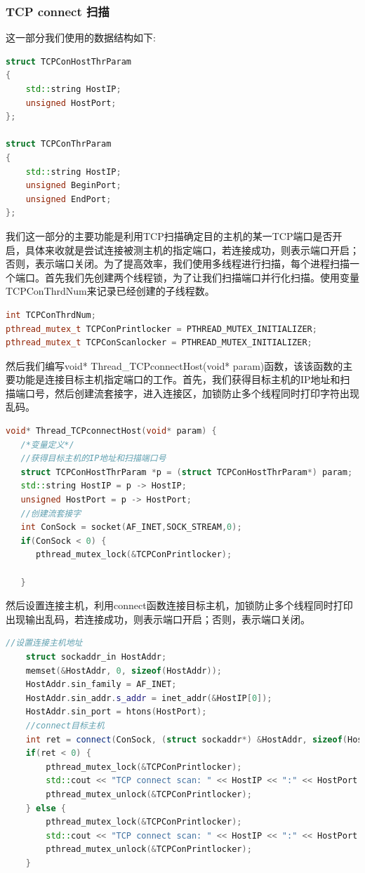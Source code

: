\documentclass[UTF8,a4paper,10pt]{ctexart}
\begin{document}
\subsubsection{TCP connect 扫描}
这一部分我们使用的数据结构如下:
\begin{lstlisting}[language = C++]
struct TCPConHostThrParam
{
	std::string HostIP;
	unsigned HostPort;
};

struct TCPConThrParam
{
	std::string HostIP;
	unsigned BeginPort;
	unsigned EndPort;
};
\end{lstlisting}
我们这一部分的主要功能是利用TCP扫描确定目的主机的某一TCP端口是否开启，具体来收就是尝试连接被测主机的指定端口，若连接成功，则表示端口开启；否则，表示端口关闭。为了提高效率，我们使用多线程进行扫描，每个进程扫描一个端口。首先我们先创建两个线程锁，为了让我们扫描端口并行化扫描。使用变量 TCPConThrdNum来记录已经创建的子线程数。
\begin{lstlisting}[language = C++]
int TCPConThrdNum;
pthread_mutex_t TCPConPrintlocker = PTHREAD_MUTEX_INITIALIZER;
pthread_mutex_t TCPConScanlocker = PTHREAD_MUTEX_INITIALIZER;
\end{lstlisting}
然后我们编写void* Thread\_TCPconnectHost(void* param)函数，该该函数的主要功能是连接目标主机指定端口的工作。首先，我们获得目标主机的IP地址和扫描端口号，然后创建流套接字，进入连接区，加锁防止多个线程同时打印字符出现乱码。
\begin{lstlisting}[language = C++]
void* Thread_TCPconnectHost(void* param) {
   /*变量定义*/
   //获得目标主机的IP地址和扫描端口号
   struct TCPConHostThrParam *p = (struct TCPConHostThrParam*) param;
   std::string HostIP = p -> HostIP;
   unsigned HostPort = p -> HostPort;
   //创建流套接字
   int ConSock = socket(AF_INET,SOCK_STREAM,0);
   if(ConSock < 0) {
      pthread_mutex_lock(&TCPConPrintlocker);

   }
\end{lstlisting}
然后设置连接主机，利用connect函数连接目标主机，加锁防止多个线程同时打印出现输出乱码，若连接成功，则表示端口开启；否则，表示端口关闭。
\begin{lstlisting}[language = C++]
   //设置连接主机地址
    struct sockaddr_in HostAddr;
    memset(&HostAddr, 0, sizeof(HostAddr));
    HostAddr.sin_family = AF_INET;
    HostAddr.sin_addr.s_addr = inet_addr(&HostIP[0]);
    HostAddr.sin_port = htons(HostPort);
    //connect目标主机
    int ret = connect(ConSock, (struct sockaddr*) &HostAddr, sizeof(HostAddr));
    if(ret < 0) {
        pthread_mutex_lock(&TCPConPrintlocker);
        std::cout << "TCP connect scan: " << HostIP << ":" << HostPort << " is closed" << std::endl;
        pthread_mutex_unlock(&TCPConPrintlocker);
    } else {
        pthread_mutex_lock(&TCPConPrintlocker);
        std::cout << "TCP connect scan: " << HostIP << ":" << HostPort << " is open" << std::endl;
        pthread_mutex_unlock(&TCPConPrintlocker);
    }
\end{lstlisting}
\end{document}
